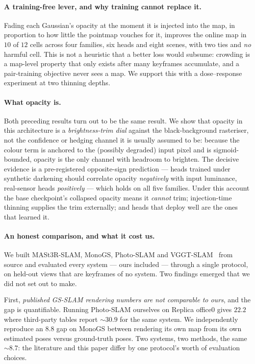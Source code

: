 \paragraph{A training-free lever, and why training cannot replace it.}
Fading each Gaussian's opacity at the moment it is injected into the map, in
proportion to how little the pointmap vouches for it, improves the online map
in $10$ of $12$ cells across four families, six heads and eight scenes, with
two ties and \emph{no} harmful cell. This is not a heuristic that a better
loss would subsume: crowding is a map-level property that only exists after
many keyframes accumulate, and a pair-training objective never sees a map. We
support this with a dose--response experiment at two thinning depths.

\paragraph{What opacity is.}
Both preceding results turn out to be the same result. We show that opacity in
this architecture is a \emph{brightness-trim dial} against the
black-background rasteriser, not the confidence or hedging channel it is
usually assumed to be: because the colour term is anchored to the (possibly
degraded) input pixel and is sigmoid-bounded, opacity is the only channel with
headroom to brighten. The decisive evidence is a pre-registered opposite-sign
prediction --- heads trained under synthetic darkening should correlate opacity
\emph{negatively} with input luminance, real-sensor heads \emph{positively} ---
which holds on all five families. Under this account the base checkpoint's
collapsed opacity means it \emph{cannot} trim; injection-time thinning supplies
the trim externally; and heads that deploy well are the ones that learned it.

\paragraph{An honest comparison, and what it cost us.}
We built MASt3R-SLAM, MonoGS, Photo-SLAM and VGGT-SLAM~\cite{maggio2025vggtslam}
from source and evaluated every system --- ours included --- through a single
protocol, on held-out views that are keyframes of no system. Two findings
emerged that we did not set out to make.

First, \emph{published GS-SLAM rendering numbers are not comparable to ours},
and the gap is quantifiable. Running Photo-SLAM ourselves on Replica office0
gives $22.2$\dB{} where third-party tables report ${\sim}30.9$\dB{} for the
same system. We independently reproduce an $8.8$\dB{} gap on MonoGS between
rendering its own map from its own estimated poses versus ground-truth poses.
Two systems, two methods, the same ${\sim}8.7$\dB{}: the literature and this
paper differ by one protocol's worth of evaluation choices.

